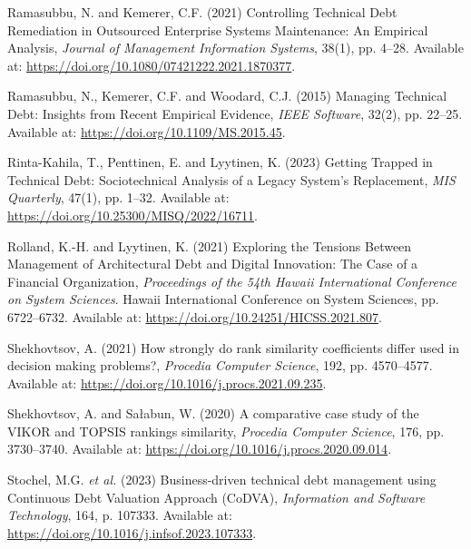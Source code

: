 \documentclass[
  12pt,
  letterpaper,
  12pt,
  oneside,
  english,
  onehalfspacing,
  headsepline]{MastersDoctoralThesis}
\newlength{\cslhangindent}
\newenvironment{CSLReferences}[2] %
 {\begin{list}{}{%
  \setlength{\itemindent}{0pt}
  \setlength{\leftmargin}{0pt}
  \setlength{\parsep}{0pt}
  \ifodd #1
   \setlength{\leftmargin}{\cslhangindent}
   \setlength{\itemindent}{-1\cslhangindent}
  \fi
  \setlength{\itemsep}{#2\baselineskip}}}
 {\end{list}}
\begin{document}
\begin{CSLReferences}{0}{1}
Ramasubbu, N. and Kemerer, C.F. (2021) \textquotesingle Controlling
{Technical Debt Remediation} in {Outsourced Enterprise Systems
Maintenance}: {An Empirical Analysis}\textquotesingle, \emph{Journal of
Management Information Systems}, 38(1), pp. 4--28. Available at:
\url{https://doi.org/10.1080/07421222.2021.1870377}.

Ramasubbu, N., Kemerer, C.F. and Woodard, C.J. (2015)
\textquotesingle Managing {Technical Debt}: {Insights} from {Recent
Empirical Evidence}\textquotesingle, \emph{IEEE Software}, 32(2), pp.
22--25. Available at: \url{https://doi.org/10.1109/MS.2015.45}.

Rinta-Kahila, T., Penttinen, E. and Lyytinen, K. (2023)
\textquotesingle Getting {Trapped} in {Technical Debt}: {Sociotechnical
Analysis} of a {Legacy System}'s {Replacement}\textquotesingle,
\emph{MIS Quarterly}, 47(1), pp. 1--32. Available at:
\url{https://doi.org/10.25300/MISQ/2022/16711}.

Rolland, K.-H. and Lyytinen, K. (2021) \textquotesingle Exploring the
{Tensions Between Management} of {Architectural Debt} and {Digital
Innovation}: {The Case} of a {Financial Organization}\textquotesingle,
\emph{Proceedings of the 54th {Hawaii International Conference} on
{System Sciences}}. Hawaii International Conference on System Sciences,
pp. 6722--6732. Available at:
\url{https://doi.org/10.24251/HICSS.2021.807}.

Shekhovtsov, A. (2021) \textquotesingle How strongly do rank similarity
coefficients differ used in decision making problems?\textquotesingle,
\emph{Procedia Computer Science}, 192, pp. 4570--4577. Available at:
\url{https://doi.org/10.1016/j.procs.2021.09.235}.

Shekhovtsov, A. and Sałabun, W. (2020) \textquotesingle A comparative
case study of the {VIKOR} and {TOPSIS} rankings
similarity\textquotesingle, \emph{Procedia Computer Science}, 176, pp.
3730--3740. Available at:
\url{https://doi.org/10.1016/j.procs.2020.09.014}.

Stochel, M.G. \emph{et al.} (2023) \textquotesingle Business-driven
technical debt management using {Continuous Debt Valuation Approach}
({CoDVA})\textquotesingle, \emph{Information and Software Technology},
164, p. 107333. Available at:
\url{https://doi.org/10.1016/j.infsof.2023.107333}.


\end{CSLReferences}
\end{document}
